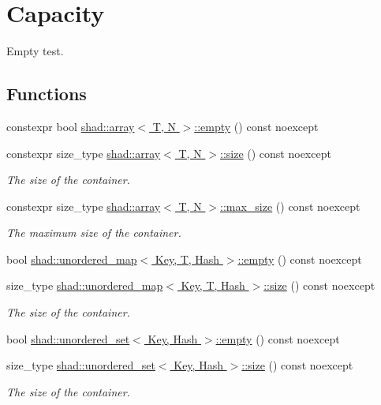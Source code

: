 \hypertarget{group__Capacity}{\section{Capacity}
\label{group__Capacity}
}


Empty test.  


\subsection*{Functions}
\begin{DoxyCompactItemize}
\item 
constexpr bool \hyperlink{group__Capacity_ga4200ae5ef6eba0507e3fb3cbf58d6ead}{shad\-::array$<$ T, N $>$\-::empty} () const noexcept
\item 
constexpr size\-\_\-type \hyperlink{group__Capacity_gaed56012900efe8db9fdc2c6023cf0c60}{shad\-::array$<$ T, N $>$\-::size} () const noexcept
\begin{DoxyCompactList}\small\item\em The size of the container. \end{DoxyCompactList}\item 
constexpr size\-\_\-type \hyperlink{group__Capacity_ga2c375adb82992e23aaaa947f39212e25}{shad\-::array$<$ T, N $>$\-::max\-\_\-size} () const noexcept
\begin{DoxyCompactList}\small\item\em The maximum size of the container. \end{DoxyCompactList}\item 
bool \hyperlink{group__Capacity_gade6abbe1bedf25b8c2fb53eab2420e71}{shad\-::unordered\-\_\-map$<$ Key, T, Hash $>$\-::empty} () const noexcept
\item 
size\-\_\-type \hyperlink{group__Capacity_ga0d8b21fa4842806604fa7a5f82d6f637}{shad\-::unordered\-\_\-map$<$ Key, T, Hash $>$\-::size} () const noexcept
\begin{DoxyCompactList}\small\item\em The size of the container. \end{DoxyCompactList}\item 
bool \hyperlink{group__Capacity_gaa881674aa4274da05c2389348d09bbd3}{shad\-::unordered\-\_\-set$<$ Key, Hash $>$\-::empty} () const noexcept
\item 
size\-\_\-type \hyperlink{group__Capacity_ga2586e3957d1c48a278edaaa1be72f92b}{shad\-::unordered\-\_\-set$<$ Key, Hash $>$\-::size} () const noexcept
\begin{DoxyCompactList}\small\item\em The size of the container. \end{DoxyCompactList}\end{DoxyCompactItemize}


